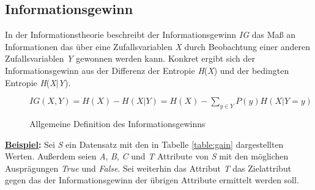 \subsection{Informationsgewinn}
\label{id3:gain}
In der Informationstheorie beschreibt der Informationsgewinn \textit{IG} das Maß an Informationen das über eine Zufallsvariablen \textit{X} durch Beobachtung einer anderen Zufallsvariablen \textit{Y} gewonnen werden kann. \autocite{DataMining} Konkret ergibt sich der Informationsgewinn aus der Differenz der Entropie \textit{H}(\textit{X}) und der bedingten Entropie \textit{H}(\textit{X}$\vert$\textit{Y}). \autocite{Informat29:online}

\begin{figure}[H]
    \label{fig:gain}
    \vspace{0.5cm}
    \centering
        $ IG(X,Y) = H(X) - H(X\vert Y) = H(X) - \sum\limits_{y\in Y} P(y)H(X\vert Y=y)$
    \caption{Allgemeine Definition des Informationsgewinns \autocites{DataMining}{ConditionalEntropy:online}{BedingteEntropie:online}}
\end{figure}

\textbf{\underline{Beispiel}:} Sei \textit{S} ein Datensatz mit den in Tabelle \ref{table:gain} dargestellten Werten. Außerdem seien \textit{A}, \textit{B}, \textit{C} und \textit{T} Attribute von \textit{S} mit den möglichen Ausprägungen \textit{True} und \textit{False}. Sei weiterhin das Attribut \textit{T} das Zielattribut gegen das der Informationsgewinn der übrigen Attribute ermittelt werden soll.

